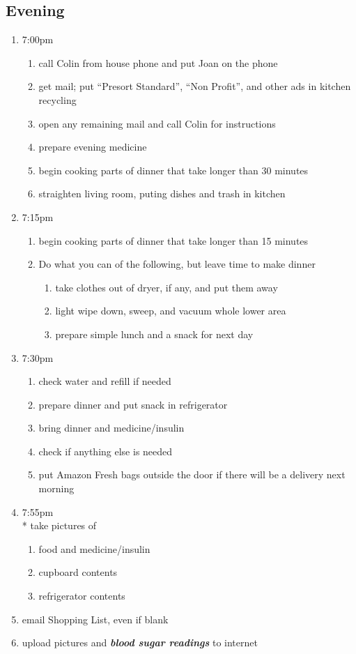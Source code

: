 \documentclass[12pt,letterpaper]{article}
\begin{document}
\begin{multicols}{2}
\subsection*{Evening}
\begin{enumerate}
	\item 7:00pm
		\begin{enumerate}
			\item call Colin from house phone and put Joan on the phone
			\item get mail; put ``Presort Standard'', ``Non Profit'', and other ads in kitchen recycling
			\item open any remaining mail and call Colin for instructions
			\item prepare evening medicine
			\item begin cooking parts of dinner that take longer than 30 minutes
			\item straighten living room, puting dishes and trash in kitchen
		\end{enumerate}
	\item 7:15pm 
		\begin{enumerate}
			\item begin cooking parts of dinner that take longer than 15 minutes
			\item	Do what you can of the following, but leave time to make dinner
				\begin{enumerate}
					\item take clothes out of dryer, if any, and put them away
					\item light wipe down, sweep, and vacuum whole lower area
					\item prepare simple lunch and a snack for next day
				\end{enumerate}
		\end{enumerate}
	\item 7:30pm
		\begin{enumerate}
			\item check water and refill if needed
			\item prepare dinner and put snack in refrigerator
			\item bring dinner and medicine/insulin
			\item check if anything else is needed
			\item put Amazon Fresh bags outside the door if there will be a delivery next morning
		\end{enumerate}
	\item 7:55pm \\*
		take pictures of 
		\begin{enumerate}
			\item food and medicine/insulin
			\item	cupboard contents
			\item	refrigerator contents
		\end{enumerate}
	\item email Shopping List, even if blank
	\item upload pictures and \textit{\textbf{blood sugar readings}} to internet
\end{enumerate}
\end{multicols}
\end{document}
